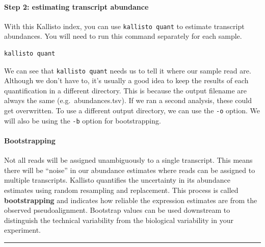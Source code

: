 \documentclass[11pt]{article}
\makeatletter
\newcommand{\boxspacing}{\kern\kvtcb@left@rule\kern\kvtcb@boxsep}
\newcommand{\prompt}[4]{
        \ttfamily\llap{{\color{#2}[#3]:\hspace{3pt}#4}}\vspace{-\baselineskip}
    }
\makeatother
\begin{document}
    \hypertarget{step-2-estimating-transcript-abundance}{%
\paragraph{Step 2: estimating transcript
abundance}\label{step-2-estimating-transcript-abundance}}

With this Kallisto index, you can use \texttt{kallisto\ quant} to
estimate transcript abundances. You will need to run this command
separately for each sample.

    \begin{tcolorbox}[breakable, size=fbox, boxrule=1pt, pad at break*=1mm,colback=cellbackground, colframe=cellborder]
\prompt{In}{incolor}{ }{\boxspacing}
\begin{Verbatim}[commandchars=\\\{\}]
kallisto quant
\end{Verbatim}
\end{tcolorbox}

    We can see that \texttt{kallisto\ quant} needs us to tell it where our
sample read are. Although we don't have to, it's usually a good idea to
keep the results of each quantification in a different directory. This
is because the output filename are always the same
(e.g.~abundances.tsv). If we ran a second analysis, these could get
overwritten. To use a different output directory, we can use the
\texttt{-o} option. We will also be using the \texttt{-b} option for
bootstrapping.

    \hypertarget{bootstrapping}{%
\paragraph{Bootstrapping}\label{bootstrapping}}

Not all reads will be assigned unambiguously to a single transcript.
This means there will be ``noise'' in our abundance estimates where
reads can be assigned to multiple transcripts. Kallisto quantifies the
uncertainty in its abundance estimates using random resampling and
replacement. This process is called \textbf{bootstrapping} and indicates
how reliable the expression estimates are from the observed
pseudoalignment. Bootstrap values can be used downstream to distinguish
the technical variability from the biological variability in your
experiment.

    \begin{center}\rule{0.5\linewidth}{0.5pt}\end{center}
\end{document}
